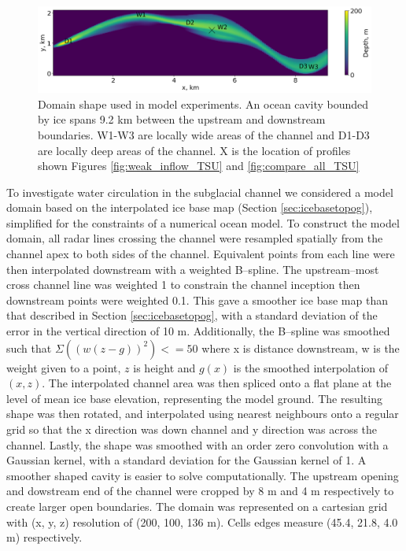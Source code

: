 \begin{figure}[!ht]
\centering
\includegraphics[width=1\textwidth]{chapters/4/domain.png}
\caption[Domain]{Domain shape used in model experiments. An ocean cavity bounded by ice spans 9.2 km between the upstream and downstream boundaries. W1-W3 are locally wide areas of the channel and D1-D3 are locally deep areas of the channel. X is the location of profiles shown Figures \ref{fig:weak_inflow_TSU} and \ref{fig:compare_all_TSU} }
\label{fig:domain}
\end{figure}

To investigate water circulation in the subglacial channel we considered a model domain based on the interpolated ice base map (Section \ref{sec:icebasetopog}), simplified for the constraints of a numerical ocean model. 
To construct the model domain, all radar lines crossing the channel were resampled spatially from the channel apex to both sides of the channel. Equivalent points from each line were then interpolated downstream with a weighted B--spline. The upstream--most cross channel line was weighted 1 to constrain the channel inception then downstream points were weighted 0.1. This gave a smoother ice base map than that described in Section \ref{sec:icebasetopog}, with a standard deviation of the error in the vertical direction of 10 m.  Additionally, the B--spline was smoothed such that $ \Sigma ((w  (z - g))^2) <= 50 $ where x is distance downstream, w is the weight given to a point, $z$ is height and $g(x)$ is the smoothed interpolation of $(x,z)$.
The interpolated channel area was then spliced onto a flat plane at the level of mean ice base elevation, representing the model ground. The resulting shape was then rotated, and interpolated using nearest neighbours onto a regular grid so that the x direction was down channel and y direction was across the channel. Lastly, the shape was smoothed with an order zero convolution with a Gaussian kernel, with a standard deviation for the Gaussian kernel of 1. A smoother shaped cavity is easier to solve computationally.
The upstream opening and dowstream end of the channel were cropped by 8 m and 4 m respectively to create larger open boundaries. 
The domain was represented on a cartesian grid with (x, y, z) resolution of (200, 100, 136 m). Cells edges measure (45.4, 21.8, 4.0 m)  respectively.

